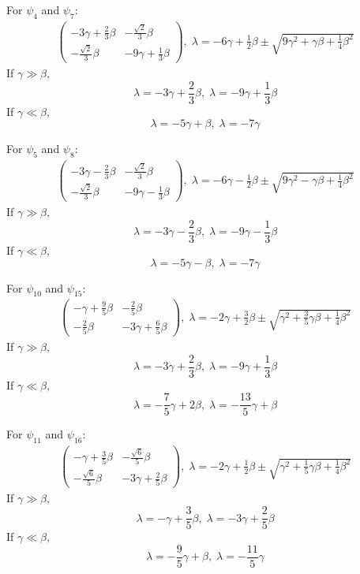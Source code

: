 For $\psi_4$ and $\psi_7:$
\begin{align*}
    \begin{pmatrix}
        -3\gamma + \frac{2}{3}\beta & -\frac{\sqrt{2}}{3}\beta\\
        -\frac{\sqrt{2}}{3}\beta & -9\gamma + \frac{1}{3}\beta
    \end{pmatrix},
    \; \lambda = -6\gamma + \frac{1}{2}\beta \pm \sqrt{9\gamma^2 + \gamma\beta + \frac{1}{4}\beta^2} 
\end{align*}
If $\gamma\gg\beta,$
$$
\lambda = -3\gamma+\frac{2}{3}\beta,\; \lambda=-9\gamma+\frac{1}{3}\beta
$$
If $\gamma\ll\beta,$
$$
\lambda =-5\gamma+\beta,\; \lambda=-7\gamma
$$

For $\psi_5$ and $\psi_8:$
\begin{align*}
    \begin{pmatrix}
        -3\gamma - \frac{2}{3}\beta & -\frac{\sqrt{2}}{3}\beta\\
        -\frac{\sqrt{2}}{3}\beta & -9\gamma - \frac{1}{3}\beta
    \end{pmatrix},
    \; \lambda = -6\gamma - \frac{1}{2}\beta \pm \sqrt{9\gamma^2 - \gamma\beta + \frac{1}{4}\beta^2} 
\end{align*}
If $\gamma\gg\beta,$
$$
\lambda = -3\gamma-\frac{2}{3}\beta,\; \lambda=-9\gamma-\frac{1}{3}\beta
$$
If $\gamma\ll\beta,$
$$
\lambda =-5\gamma-\beta,\; \lambda=-7\gamma
$$

For $\psi_{10}$ and $\psi_{15}:$
\begin{align*}
    \begin{pmatrix}
        -\gamma + \frac{9}{5}\beta & -\frac{2}{5}\beta\\
        -\frac{2}{5}\beta & -3\gamma + \frac{6}{5}\beta
    \end{pmatrix},
    \; \lambda = -2\gamma + \frac{3}{2}\beta \pm \sqrt{\gamma^2 + \frac{3}{5}\gamma\beta + \frac{1}{4}\beta^2} 
\end{align*}
If $\gamma\gg\beta,$
$$
\lambda = -3\gamma+\frac{2}{3}\beta,\; \lambda=-9\gamma+\frac{1}{3}\beta
$$
If $\gamma\ll\beta,$
$$
\lambda =-\frac{7}{5}\gamma+2\beta,\; \lambda=-\frac{13}{5}\gamma+\beta
$$

For $\psi_{11}$ and $\psi_{16}:$
\begin{align*}
    \begin{pmatrix}
        -\gamma + \frac{3}{5}\beta & -\frac{\sqrt{6}}{5}\beta\\
        -\frac{\sqrt{6}}{5}\beta & -3\gamma + \frac{2}{5}\beta
    \end{pmatrix},
    \; \lambda = -2\gamma + \frac{1}{2}\beta \pm \sqrt{\gamma^2 + \frac{1}{5}\gamma\beta + \frac{1}{4}\beta^2} 
\end{align*}
If $\gamma\gg\beta,$
$$
\lambda = -\gamma+\frac{3}{5}\beta,\; \lambda=-3\gamma+\frac{2}{5}\beta
$$
If $\gamma\ll\beta,$
$$
\lambda =-\frac{9}{5}\gamma+\beta,\; \lambda=-\frac{11}{5}\gamma
$$



